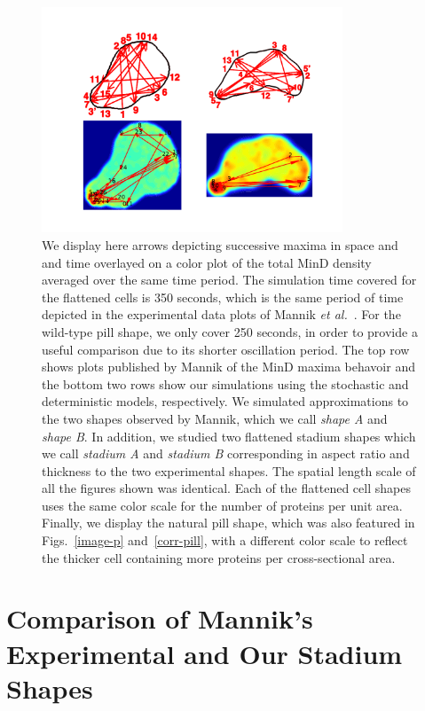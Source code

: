 \documentclass[letterpaper,twocolumn,amsmath,amssymb,pre]{revtex4-1}
\begin{document}
\begin{figure}
  \centering
  \includegraphics[width=0.8\textwidth]{../paper/plot-ave}
  \caption{We display here arrows depicting successive maxima in space
    and and time overlayed on a color plot of the total MinD density
    averaged over the same time period.  The simulation time covered
    for the flattened cells is 350 seconds, which is the same
    period of time depicted in the experimental data plots of Mannik
    \emph{et al.}~\cite{mannik2012robustness}.  For the wild-type pill
    shape, we only cover 250 seconds, in order to provide a
    useful comparison due to its shorter oscillation period.  The top
    row shows plots published by Mannik of the MinD maxima behavoir
    and the bottom two rows show our simulations using the stochastic
    and deterministic models, respectively.  We simulated
    approximations to the two shapes observed by Mannik, which we call
    \emph{shape A} and \emph{shape B}.  In addition, we studied two
    flattened stadium shapes which we call \emph{stadium A} and
    \emph{stadium B} corresponding in aspect ratio and thickness to
    the two experimental shapes.  The spatial length scale of all the
    figures shown was identical. Each of the flattened cell shapes
    uses the same color scale for the number of proteins per unit
    area.  Finally, we display the natural pill shape, which was also
    featured in Figs.~\ref{image-p} and~\ref{corr-pill}, with a
    different color scale to reflect the thicker cell containing more
    proteins per cross-sectional area.  }
  \label{randst-plot-ave}
\end{figure}

\section{Comparison of Mannik's Experimental and Our Stadium Shapes}
\end{document}
